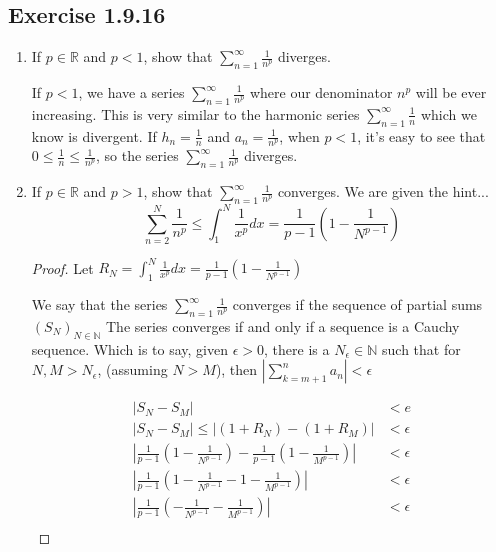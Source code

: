 \documentclass{tufte-book}
\theoremstyle{mytheoremstyle}
\theoremstyle{mylemstyle}
\theoremstyle{mydefstyle}
\begin{document}
\subsection{Exercise 1.9.16}

\begin{enumerate}

\item If $p \in \mathbb{R}$ and $p < 1$, show that $\sum_{n=1}^{\infty}\frac{1}{n^p}$ diverges.



If  $p < 1$, we have a series $\sum_{n=1}^{\infty}\frac{1}{n^p}$ where our denominator $n^p$ will be ever increasing.  This is very similar to the harmonic series $\sum_{n=1}^{\infty}\frac{1}{n}$ which we know is divergent.  If $h_n = \frac{1}{n}$ and $a_n = \frac{1}{n^p}$, when $p < 1$, it's easy to see that
$0 \leq \frac{1}{n} \leq \frac{1}{n^p}$, so the series $\sum_{n=1}^{\infty}\frac{1}{n^p}$ diverges.


\item If $p \in \mathbb{R}$ and $p > 1$, show that $\sum_{n=1}^{\infty}\frac{1}{n^p}$ converges.
We are given the hint...
\[ \sum_{n=2}^{N}\frac{1}{n^p} \leq \int_{1}^{N} \frac{1}{x^p}dx = \frac{1}{p-1}(1-\frac{1}{N^{p-1}})\]


\begin{proof}


Let $R_N = \int_{1}^{N} \frac{1}{x^p}dx = \frac{1}{p-1}(1-\frac{1}{N^{p-1}})$

We  say that the series $\sum_{n=1}^{\infty}\frac{1}{n^p}$ converges if the sequence of partial sums $(S_N)_{N \in \mathbb{N}}$  The series converges if and only if a sequence is a Cauchy sequence.  Which is to say, given $\epsilon > 0$, there is a $N_\epsilon\in \mathbb{N}$ such that for $N,M > N_\epsilon$, (assuming $N>M$), then $|\sum_{k=m+1}^{n}a_n| < \epsilon$

\begin{align*}
|S_N - S_M| &< e \\
|S_N - S_M| \leq |(1 + R_N) - (1 + R_M)| &< \epsilon \\
|\frac{1}{p-1}(1-\frac{1}{N^{p-1}}) - \frac{1}{p-1}(1-\frac{1}{M^{p-1}})| &< \epsilon \\
|\frac{1}{p-1}(1-\frac{1}{N^{p-1}} - 1-\frac{1}{M^{p-1}})| &< \epsilon\\
|\frac{1}{p-1}(-\frac{1}{N^{p-1}} - \frac{1}{M^{p-1}})| &< \epsilon\\
\end{align*}


\end{proof}
\end{enumerate}
\end{document}
